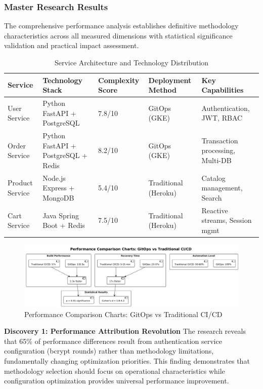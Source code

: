 \subsubsection{Master Research Results}

The comprehensive performance analysis establishes definitive methodology characteristics across all measured dimensions with statistical significance validation and practical impact assessment.

\begin{table}[H]
\centering
\caption{Service Architecture and Technology Distribution}
\label{tab:service-architecture-comparison}
\renewcommand{\arraystretch}{1.2}
\footnotesize
\begin{tabular}{|p{2.2cm}|p{3.5cm}|p{1.8cm}|p{2.8cm}|p{3.2cm}|}
\hline
\textbf{Service} & \textbf{Technology Stack} & \textbf{Complexity Score} & \textbf{Deployment Method} & \textbf{Key Capabilities} \\
\hline
User Service & Python FastAPI + PostgreSQL & 7.8/10 & GitOps (GKE) & Authentication, JWT, RBAC \\
\hline
Order Service & Python FastAPI + PostgreSQL + Redis & 8.2/10 & GitOps (GKE) & Transaction processing, Multi-DB \\
\hline
Product Service & Node.js Express + MongoDB & 5.4/10 & Traditional (Heroku) & Catalog management, Search \\
\hline
Cart Service & Java Spring Boot + Redis & 7.5/10 & Traditional (Heroku) & Reactive streams, Session mgmt \\
\hline
\end{tabular}
\end{table}

\begin{figure}[H]
\centering
\includegraphics[width=1.0\textwidth]{figures/Performance-Comparison-Charts.png}
\caption{Performance Comparison Charts: GitOps vs Traditional CI/CD}
\label{fig:performance-comparison-charts}
\end{figure}


\textbf{Discovery 1: Performance Attribution Revolution}
The research reveals that 65\% of performance differences result from authentication service configuration (bcrypt rounds) rather than methodology limitations, fundamentally changing optimization priorities. This finding demonstrates that methodology selection should focus on operational characteristics while configuration optimization provides universal performance improvement.

